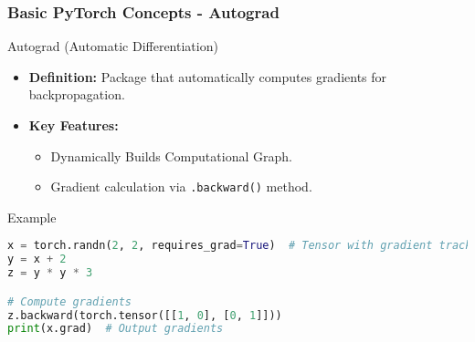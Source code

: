 \documentclass[aspectratio=169]{beamer}
\begin{document}
\begin{frame}[fragile]
    \frametitle{Basic PyTorch Concepts - Autograd}
    \begin{block}{Autograd (Automatic Differentiation)}
        \begin{itemize}
            \item \textbf{Definition:} Package that automatically computes gradients for backpropagation.
            \item \textbf{Key Features:}
            \begin{itemize}
                \item Dynamically Builds Computational Graph.
                \item Gradient calculation via \texttt{.backward()} method.
            \end{itemize}
        \end{itemize}
    \end{block}

    \begin{block}{Example}
    \begin{lstlisting}[language=Python]
x = torch.randn(2, 2, requires_grad=True)  # Tensor with gradient tracking
y = x + 2
z = y * y * 3

# Compute gradients
z.backward(torch.tensor([[1, 0], [0, 1]]))
print(x.grad)  # Output gradients
    \end{lstlisting}
    \end{block}
\end{frame}
\end{document}
